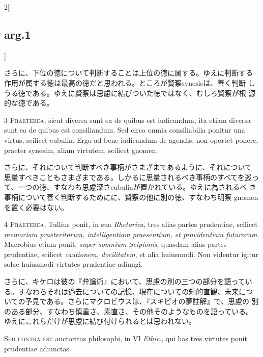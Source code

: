 \documentclass[paper=a4paper,fontsize=10pt,jafontsize=9pt,titlepage]{jlreq}
\begin{document}
\begin{paracol}{2}[\subsection{arg.1}]
\switchcolumn

さらに、下位の徳について判断することは上位の徳に属する。ゆえに判断する
作用が属する徳は最高の徳だと思われる。ところが賢察synesisは、善く判断
しうる徳である。ゆえに賢察は思慮に結びついた徳ではなく、むしろ賢察が根
源的な徳である。


{\scshape 3 Praeterea}, sicut diversa sunt ea de quibus est
iudicandum, ita etiam diversa sunt ea de quibus est consiliandum. Sed
circa omnia consiliabilia ponitur una virtus, scilicet eubulia. Ergo
ad bene iudicandum de agendis, non oportet ponere, praeter synesim,
aliam virtutem, scilicet gnomen.

\switchcolumn

さらに、それについて判断すべき事柄がさまざまであるように、それについて
思量すべきこともさまざまである。しかるに思量されるべき事柄のすべてを巡っ
て、一つの徳、すなわち思慮深さeubuliaが置かれている。ゆえに為されるべ
き事柄について善く判断するためにに、賢察の他に別の徳、すなわち明察
gnomenを置く必要はない。

\switchcolumn*

4 {\scshape Praeterea}, Tullius ponit, in sua {\itshape Rhetorica},
tres alias partes prudentiae, scilicet {\itshape memoriam
praeteritorum, intelligentiam praesentium, et providentiam
futurorum}. Macrobius etiam ponit, {\itshape super somnium Scipionis},
quasdam alias partes prudentiae, scilicet {\itshape cautionem,
docilitatem}, et alia huiusmodi. Non videntur igitur solae huiusmodi
virtutes prudentiae adiungi.

\switchcolumn

さらに、キケロは彼の『弁論術』において、思慮の別の三つの部分を語ってい
る。すなわちそれは過去についての記憶、現在についての知的直観、未来につ
いての予見である。さらにマクロビウスは、『スキピオの夢註解』で、思慮の
別のある部分、すなわち慎重さ、素直さ、その他そのようなものを語っている。
ゆえにこれらだけが思慮に結び付けられるとは思われない。

\switchcolumn*[\subsection{s.c.}]

{\scshape Sed contra est} auctoritas philosophi, in VI {\itshape
Ethic}., qui has tres virtutes ponit prudentiae adiunctas.


\end{paracol}
\end{document}
